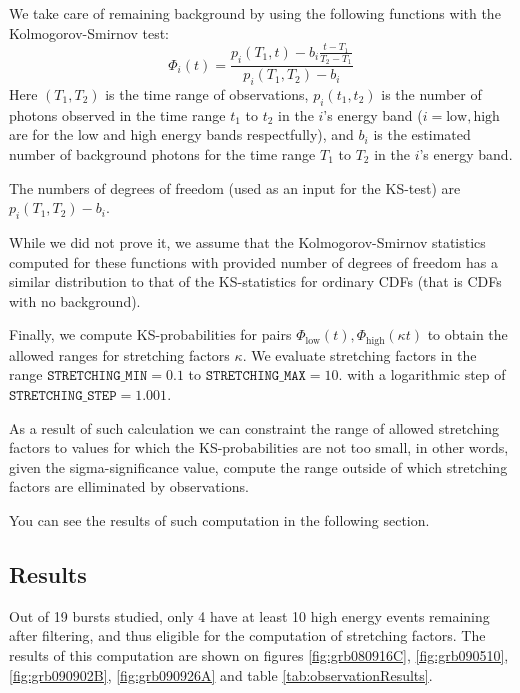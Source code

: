 \documentclass{article}
\begin{document}
We take care of remaining background by using the following functions with the Kolmogorov-Smirnov test:
\begin{equation}
	\Phi_i\left(t\right) = \frac{p_i\left(T_1, t\right) - b_i \frac{t-T_1}{T_2-T_1}}{p_i\left(T_1, T_2\right) - b_i}
\end{equation}
Here $\left(T_1, T_2\right)$ is the time range of observations, $p_i\left(t_1, t_2\right)$ is the number of photons observed in the time range $t_1$ to $t_2$ in the $i$'s energy band ($i=\text{low},\text{high}$ are for the low and high energy bands respectfully), and $b_i$ is the estimated number of background photons for the time range $T_1$ to $T_2$ in the $i$'s energy band.

The numbers of degrees of freedom (used as an input for the KS-test) are $p_i\left(T_1, T_2\right) - b_i$.

While we did not prove it, we assume that the Kolmogorov-Smirnov statistics computed for these functions with provided number of degrees of freedom has a similar distribution to that of the KS-statistics for ordinary CDFs (that is CDFs with no background).

Finally, we compute KS-probabilities for pairs $\Phi_\text{low}\left(t\right), \Phi_\text{high}\left(\kappa t\right)$ to obtain the allowed ranges for stretching factors $\kappa$. We evaluate stretching factors in the range $\texttt{STRETCHING\_MIN} = 0.1$ to $\texttt{STRETCHING\_MAX} = 10.$ with a logarithmic step of $\texttt{STRETCHING\_STEP} = 1.001$.

As a result of such calculation we can constraint the range of allowed stretching factors to values for which the KS-probabilities are not too small, in other words, given the sigma-significance value, compute the range outside of which stretching factors are elliminated by observations.

You can see the results of such computation in the following section.

\subsection{Results}

Out of 19 bursts studied, only 4 have at least 10 high energy events remaining after filtering, and thus eligible for the computation of stretching factors. The results of this computation are shown on figures \ref{fig:grb080916C}, \ref{fig:grb090510}, \ref{fig:grb090902B}, \ref{fig:grb090926A} and table \ref{tab:observationResults}.
\end{document}
